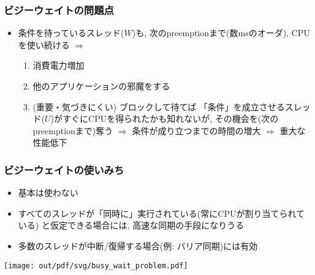 \documentclass[12pt,dvipdfmx]{beamer}
\begin{document}
\begin{frame}[fragile]
  \frametitle{ビジーウェイトの問題点}
  \begin{itemize}
  \item[] 条件を待っているスレッド($W$)も, 
    次のpreemptionまで(数msのオーダ), CPUを使い続ける $\Rightarrow$
    \begin{enumerate}
    \item 消費電力増加
    \item 他のアプリケーションの邪魔をする
    \item (重要・気づきにくい)
      ブロックして待てば
      「条件」を成立させるスレッド($U$)がすぐにCPUを得られたかも知れないが,
      その機会を(次のpreemptionまで)奪う
      $\Rightarrow$ 条件が成り立つまでの時間の増大
      $\Rightarrow$ 重大な性能低下
    \end{enumerate}
  \end{itemize}
\end{frame}

\begin{frame}
  \frametitle{ビジーウェイトの使いみち}
  \begin{itemize}
  \item 基本は使わない
  \item すべてのスレッドが「同時に」実行されている(常にCPUが割り当てられている)
    と仮定できる場合には, 高速な同期の手段になりうる
  \item 多数のスレッドが中断/復帰する場合(例: バリア同期)には有効
  \end{itemize}
  \begin{center}
\texttt{[image: out/pdf/svg/busy\_wait\_problem.pdf]}
  \end{center}
\end{frame}
\end{document}
